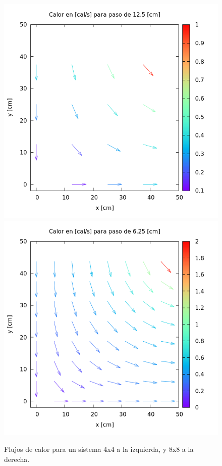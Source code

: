 \documentclass[12pt, notitlepage]{article}
\begin{document}
\begin{figure}[H]
\centering
\includegraphics[scale=0.35]{125unit.png}
\includegraphics[scale=0.35]{625unit.png}
\caption{Flujos de calor para un sistema 4x4 a la izquierda, y 8x8 a la derecha.}
\end{figure}
\end{document}
